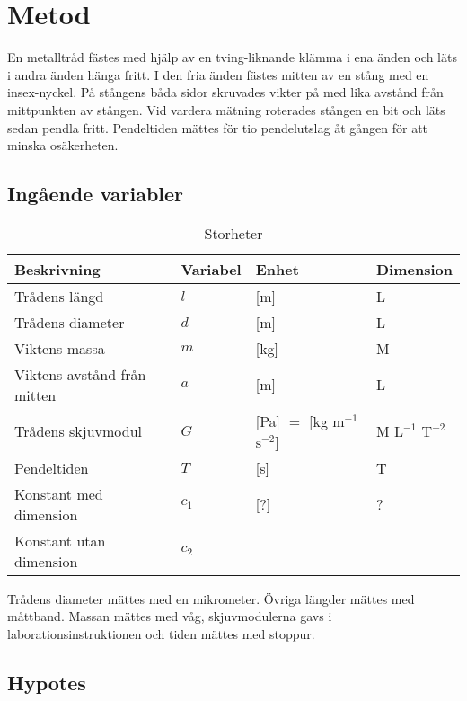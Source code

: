 \documentclass[a4paper,12pt]{article}
\begin{document}
\section{Metod}

En metalltråd fästes med hjälp av en tving-liknande klämma i ena änden och läts
i andra änden hänga fritt. I den fria änden fästes mitten av en stång med en
insex-nyckel. På stångens båda sidor skruvades vikter på med lika avstånd från
mittpunkten av stången. Vid vardera mätning roterades stången en bit och läts
sedan pendla fritt. Pendeltiden mättes för tio pendelutslag åt gången för att
minska osäkerheten.

\subsection{Ingående variabler}

\begin{table}[h!]
  \caption{Storheter}
  \label{tab:storheter}
  \begin{tabular} {| l | l | l | l |}
    \hline
    \textbf{Beskrivning} & \textbf{Variabel} & \textbf{Enhet} & \textbf{Dimension} \\\hline
    Trådens längd & $l$ & [m] & L \\\hline
    Trådens diameter & $d$ & [m] & L \\\hline
    Viktens massa & $m$ & [kg] & M \\\hline
    Viktens avstånd från mitten & $a$ & [m] & L \\\hline
    Trådens skjuvmodul & $G$ & [Pa] $=$ [kg $\mathrm{m}^{-1}$ $\mathrm{s}^{-2}$] & M $\mathrm{L}^{-1}$ $\mathrm{T}^{-2}$ \\\hline
    Pendeltiden & $T$ & [s] & T \\\hline
    Konstant med dimension & $c_1$ & [?] & ? \\\hline
    Konstant utan dimension & $c_2$ && \\\hline
  \end{tabular}
\end{table}

Trådens diameter mättes med en mikrometer. Övriga längder mättes med måttband.
Massan mättes med våg, skjuvmodulerna gavs i laborationsinstruktionen och
tiden mättes med stoppur.

\subsection{Hypotes}
\end{document}
